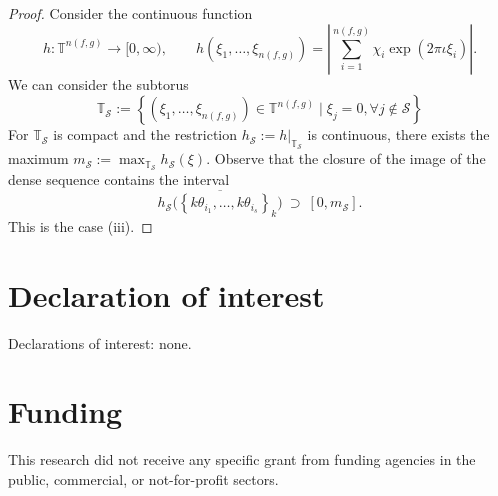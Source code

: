 \documentclass[oneside]{amsart}
\begin{document}
\begin{proof}
  Consider the continuous function
  \[
    h: \mathbb{T}^{n(f, g)} \to [0, \infty), \qquad
    h(\xi_1, \dots, \xi_{n(f, g)}) = \left| \sum_{i=1}^{n(f, g)} \chi_i \exp(2\pi\iota \xi_i) \right|.
  \]
  We can consider the subtorus
  \[
    \mathbb{T}_{\mathcal{S}} := \left\{ (\xi_1, \dots, \xi_{n(f, g)})
      \in \mathbb{T}^{n(f, g)} \mid \xi_j = 0, \forall j \notin \mathcal{S} \right\}
  \]
  For $\mathbb{T}_{\mathcal{S}}$ is compact and the restriction
  $h_\mathcal{S} := \left. h \right|_{\mathbb{T}_\mathcal{S}}$
  is continuous, there exists the maximum $m_\mathcal{S} := \max_{\mathbb{T}_{\mathcal{S}}} h_\mathcal{S}(\xi)$.
  Observe that the closure of the image of the dense sequence contains the interval
  \[
    \overline{h_\mathcal{S}\big( \left\{ k\theta_{i_1}, \dots, k\theta_{i_s} \right\}_k \big)}
    \ \supset \ [0, m_\mathcal{S}].
  \]
  This is the case (iii).
\end{proof}












\vspace{1cm}
\section*{Declaration of interest}
Declarations of interest: none.


\vspace{1cm}
\section*{Funding}
This research did not receive any specific grant from funding agencies in the public, commercial,
or not-for-profit sectors.
\end{document}
